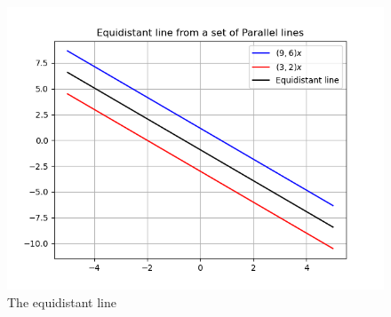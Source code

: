 \documentclass[journal,12pt,twocolumn]{IEEEtran}
\begin{document}
\begin{figure}[!ht]
\centering
 \includegraphics[width=\columnwidth]{graph.png}
 \caption{The equidistant line}
 \end{figure}
\end{document}

